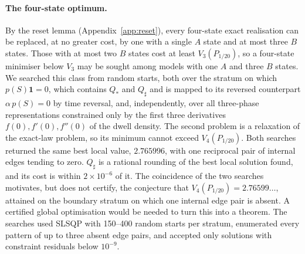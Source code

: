 \documentclass[11pt,a4paper]{article}
\theoremstyle{remark}\newtheorem{remark}[theorem]{Remark}
\newcommand{\one}{\mathbf 1}
\begin{document}
\paragraph{The four-state optimum.}
By the reset lemma (Appendix~\ref{app:reset}), every four-state exact
realisation can be replaced, at no greater cost, by one with a single $A$
state and at most three $B$ states. Those with at most two $B$ states cost at
least $V_3(P_{1/20})$, so a four-state minimiser below $V_3$ may be sought
among models with one $A$ and three $B$ states. We searched this class
from random starts, both over the stratum on which $p(S)\one=0$, which contains
$Q_*$ and $Q_\sharp$ and is mapped to its reversed counterpart
$\alpha\,p(S)=0$ by time reversal, and, independently, over all three-phase
representations constrained only by the first three derivatives
$f(0),f'(0),f''(0)$ of the dwell density. The second problem is a relaxation of
the exact-law problem, so its minimum cannot exceed $V_4(P_{1/20})$. Both
searches returned the same best local value, $2.765996$, with one reciprocal
pair of internal edges tending to zero. $Q_\sharp$ is a rational rounding of
the best local solution found, and its cost is within $2\times10^{-6}$ of it.
The coincidence of the two searches motivates, but does not certify, the
conjecture that $V_4(P_{1/20})=2.76599\ldots$, attained on the boundary stratum
on which one internal edge pair is absent. A certified global optimisation
would be needed to turn this into a theorem. The searches used SLSQP with
150--400 random starts per stratum, enumerated every pattern of up to three
absent edge pairs, and accepted only solutions with constraint residuals
below $10^{-9}$.
\end{document}
